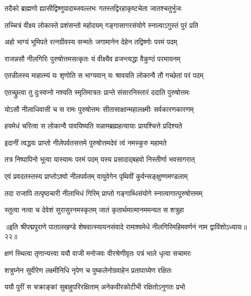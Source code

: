 \twolineshloka
{तदैको ब्राह्मणो ह्यासीद्विष्णुपादाब्जवल्लभः}
{गतस्तद्विरहाकृष्टचेता जातश्चतुर्भुजः}%

\twolineshloka
{तच्चित्रं वीक्ष्य लोकास्ते प्रशंसन्तो महोदयम्}
{गङ्गासागरसंयोगे स्नात्वाऽगुस्तं पुरं प्रति}%

\twolineshloka
{अहो भाग्यं भूमिपते रत्नग्रीवस्य सन्मतेः}
{जगामानेन देहेन तद्विष्णोः परमं पदम्}%

\twolineshloka
{राजन्नसौ नीलगिरिः पुरुषोत्तमसत्कृतः}
{यं वीक्ष्यैव व्रजन्त्यद्धा वैकुण्ठं परमायनम्}%

\twolineshloka
{एतन्नीलस्य माहात्म्यं यः शृणोति स भाग्यवान्}
{यः श्रावयति लोकान्वै तौ गच्छेतां परं पदम्}%

\twolineshloka
{एतच्छ्रुत्वा तु दुःस्वप्नो नश्यति स्मृतिमात्रतः}
{प्रान्ते संसारनिस्तारं ददाति पुरुषोत्तमः}%

\twolineshloka
{योऽसौ नीलाधिवासी च स रामः पुरुषोत्तमः}
{सीतासाक्षान्महालक्ष्मीः सर्वकारणकारणम्}%

\twolineshloka
{हयमेधं चरित्वा स लोकान्वै पावयिष्यति}
{यन्नामब्रह्महत्यायाः प्रायश्चित्ते प्रदिश्यते}%

\twolineshloka
{इदानीं त्वद्धयः प्राप्तो नीलेपर्वतसत्तमे}
{पुरुषोत्तमदेवं त्वं नमस्कुरु महामते}%

\twolineshloka
{तत्र निष्पापिनो भूत्वा यास्यामः परमं पदम्}
{यस्य प्रसादाद्बहवो निस्तीर्णा भवसागरात्}%

\twolineshloka
{एवं प्रवदतस्तस्य प्राप्तोऽश्वो नीलपर्वतम्}
{वायुवेगेन पृथिवीं कुर्वन्सङ्क्षुण्णमण्डलाम्}%

\twolineshloka
{तदा राजापि तत्पृष्ठचारी नीलाभिधं गिरिम्}
{प्राप्तो गङ्गाब्धिसंयोगे स्नात्वागात्पुरुषोत्तमम्}%

\twolineshloka
{स्तुत्वा नत्वा च देवेशं सुरासुरनमस्कृतम्}
{जातं कृतार्थमात्मानममन्यत स शत्रुहा}%

{॥इति श्रीपद्मपुराणे पातालखण्डे शेषवात्स्यायनसंवादे रामाश्वमेधे नीलगिरिमहिमवर्णनं नाम द्वाविंशोऽध्यायः॥२२॥}



\twolineshloka
{क्षणं स्थित्वा तृणान्यत्त्वा ययौ वाजी मनोजवः}
{वीरश्रेणीवृतः पत्रं भाले धृत्वा सचामरः}%

\twolineshloka
{शत्रुघ्नेन सुवीरेण लक्ष्मीनिधि नृपेण च}
{पुष्कलेनोग्रवाहेन प्रतापाग्र्येण रक्षितः}%

\twolineshloka
{ययौ पुरीं स चक्राङ्कां सुबाहुपरिरक्षिताम्}
{अनेकवीरकोटीभी रक्षितोऽनुगतः प्रभो}%

